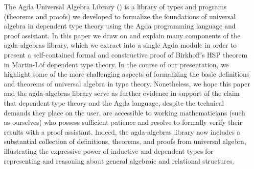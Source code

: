 The Agda Universal Algebra Library (\agdaalgebras) is a library of types and programs (theorems and proofs) we developed to formalize the foundations of universal algebra in dependent type theory using the Agda programming language and proof assistant. In this paper we draw on and explain many components of the agda-algebras library, which we extract into a single Agda module in order to present a self-contained formal and constructive proof of Birkhoff's HSP theorem in Martin-L\"of dependent type theory. In the course of our presentation, we highlight some of the more challenging aspects of formalizing the basic definitions and theorems of universal algebra in type theory. Nonetheless, we hope this paper and the agda-algebras library serve as further evidence in support of the claim that dependent type theory and the Agda language, despite the technical demands they place on the user, are accessible to working mathematicians (such as ourselves) who possess sufficient patience and resolve to formally verify their results with a proof assistant. Indeed, the agda-algebras library now includes a substantial collection of definitions, theorems, and proofs from universal algebra, illustrating the expressive power of inductive and dependent types for representing and reasoning about general algebraic and relational structures.
